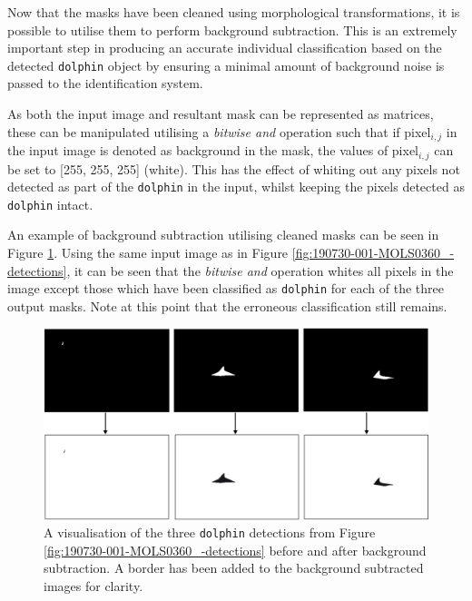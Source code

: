 Now that the masks have been cleaned using morphological transformations, it is possible to utilise them to perform background subtraction. This is an extremely important step in producing an accurate individual classification based on the detected \texttt{dolphin} object by ensuring a minimal amount of background noise is passed to the identification system.

As both the input image and resultant mask can be represented as matrices, these can be manipulated utilising a \textit{bitwise and} operation such that if pixel$_{i, j}$ in the input image is denoted as background in the mask, the values of pixel$_{i, j}$ can be set to [255, 255, 255] (white). This has the effect of whiting out any pixels not detected as part of the \texttt{dolphin} in the input, whilst keeping the pixels detected as \texttt{dolphin} intact.

An example of background subtraction utilising cleaned masks can be seen in Figure \ref{fig:190730-001-MOLS0360_-bg-subtraction}. Using the same input image as in Figure \ref{fig:190730-001-MOLS0360_-detections}, it can be seen that the \textit{bitwise and} operation whites all pixels in the image except those which have been classified as \texttt{dolphin} for each of the three output masks. Note at this point that the erroneous classification still remains. 

\begin{figure}
	\begin{center}
		\includegraphics[scale=0.45]{Chapter3/figs/190730-001-MOLS0360_-bg-subtraction.png}
	\end{center}
	\caption[A visualisation of the three \texttt{dolphin} detections from Figure \ref{fig:190730-001-MOLS0360_-detections} before and after background subtraction.]{A visualisation of the three \texttt{dolphin} detections from Figure \ref{fig:190730-001-MOLS0360_-detections} before and after background subtraction. A border has been added to the background subtracted images for clarity.}
	\label{fig:190730-001-MOLS0360_-bg-subtraction}
\end{figure}

